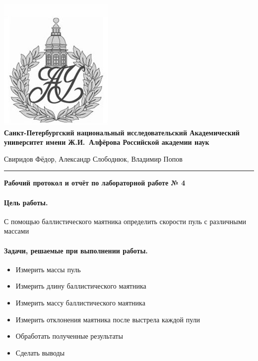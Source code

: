 \documentclass{article}
\begin{document}
	\begin{center}
		\includegraphics[scale=0.25]{AU}\\
		{\Large\bfseries Санкт-Петербургский национальный исследовательский Академический университет имени Ж.И.~Алфёрова Российской академии наук}
	\end{center}

	\begin{center}
		Свиридов Фёдор, Александр Слободнюк, Владимир Попов
	\end{center}
	\rule{12cm}{0.4mm}
	\begin{center}
		{\large\textbf{Рабочий протокол и отчёт по лабораторной работе № 4}}
	\end{center}
\paragraph{Цель работы.}
С помощью баллистического маятника определить скорости пуль с различными массами

\paragraph{Задачи, решаемые при выполнении работы.}
\begin{itemize}
	\item Измерить массы пуль
	\item Измерить длину баллистического маятника
	\item Измерить массу баллистического маятника
	\item Измерить отклонения маятника после выстрела каждой пули
	\item Обработать полученные результаты
	\item Сделать выводы
\end{itemize}
\end{document}
